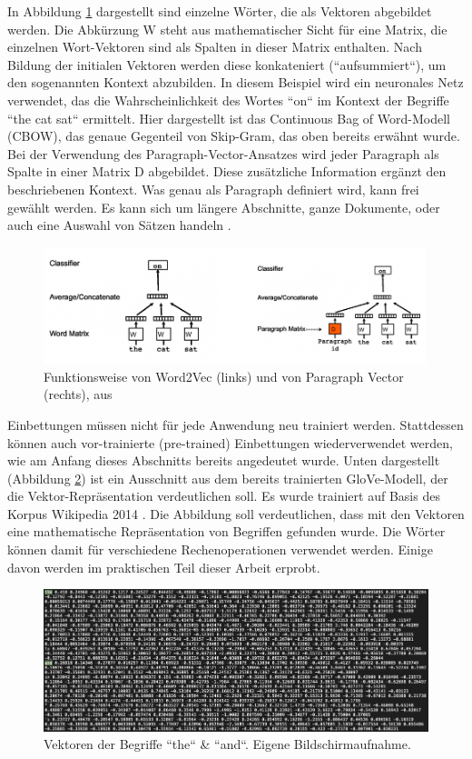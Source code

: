 In Abbildung \ref{Abbildung:mikolov} dargestellt sind einzelne Wörter, die als Vektoren abgebildet werden. Die Abkürzung W steht aus mathematischer Sicht für eine Matrix, die einzelnen Wort-Vektoren sind als Spalten in dieser Matrix enthalten. Nach Bildung der initialen Vektoren werden diese konkateniert (``aufsummiert``), um den sogenannten Kontext abzubilden. In diesem Beispiel wird ein neuronales Netz verwendet, das die Wahrscheinlichkeit des Wortes ``on`` im Kontext der Begriffe ``the cat sat`` ermittelt. Hier dargestellt ist das Continuous Bag of Word-Modell (CBOW), das genaue Gegenteil von Skip-Gram, das oben bereits erwähnt wurde. Bei der Verwendung des Paragraph-Vector-Ansatzes wird jeder Paragraph als Spalte in einer Matrix D abgebildet. Diese zusätzliche Information ergänzt den beschriebenen Kontext. Was genau als Paragraph definiert wird, kann frei gewählt werden. Es kann sich um längere Abschnitte, ganze Dokumente, oder auch eine Auswahl von Sätzen handeln \cite{mikolov2014}.
 
\begin{figure}[h]
\centering
\includegraphics[scale=0.9]{content/pics/Picture_5.png}
\caption{Funktionsweise von Word2Vec (links) und von Paragraph Vector (rechts), aus \cite{mikolov2014}}
\label{Abbildung:mikolov}
\end{figure}

Einbettungen müssen nicht für jede Anwendung neu trainiert werden. Stattdessen können auch vor-trainierte (pre-trained) Einbettungen wiederverwendet werden, wie am Anfang dieses Abschnitts bereits angedeutet wurde. Unten dargestellt (Abbildung \ref{Abbildung:word_vecs}) ist ein Ausschnitt aus dem bereits trainierten GloVe-Modell, der die Vektor-Repräsentation verdeutlichen soll. Es wurde trainiert auf Basis des Korpus Wikipedia 2014 \cite{stanford}. Die Abbildung soll verdeutlichen, dass mit den Vektoren eine mathematische Repräsentation von Begriffen gefunden wurde. Die Wörter können damit für verschiedene Rechenoperationen verwendet werden. Einige davon werden im praktischen Teil dieser Arbeit erprobt. 

\begin{figure}[h]
\centering
\includegraphics[scale=0.9]{content/pics/Picture_6.png}
\caption{Vektoren der Begriffe ``the`` \& ``and``. Eigene Bildschirmaufnahme.}
\label{Abbildung:word_vecs}
\end{figure}
 
